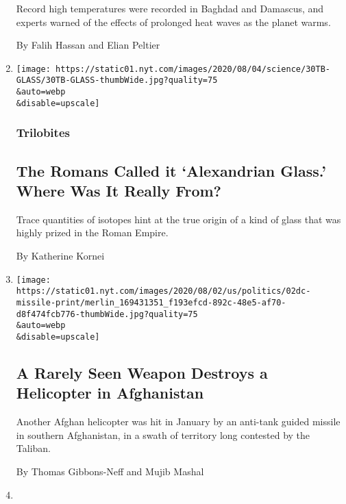 \begin{enumerate}
  Record high temperatures were recorded in Baghdad and Damascus, and
  experts warned of the effects of prolonged heat waves as the planet
  warms.

  By Falih Hassan and Elian Peltier
\item
  \href{/2020/07/31/science/alexandrian-glass-rome.html}{}

  \texttt{[image: https://static01.nyt.com/images/2020/08/04/science/30TB-GLASS/30TB-GLASS-thumbWide.jpg?quality=75\\\&auto=webp\\\&disable=upscale]}

  \hypertarget{trilobites}{%
  \subsubsection{Trilobites}\label{trilobites}}

  \hypertarget{the-romans-called-it-alexandrian-glass-where-was-it-really-from}{%
  \subsection{The Romans Called it `Alexandrian Glass.' Where Was It
  Really
  From?}\label{the-romans-called-it-alexandrian-glass-where-was-it-really-from}}

  Trace quantities of isotopes hint at the true origin of a kind of
  glass that was highly prized in the Roman Empire.

  By Katherine Kornei
\item
  \href{/2020/07/30/world/asia/afghanistan-taliban-helicopter-missile.html}{}

  \texttt{[image: https://static01.nyt.com/images/2020/08/02/us/politics/02dc-missile-print/merlin\_169431351\_f193efcd-892c-48e5-af70-d8f474fcb776-thumbWide.jpg?quality=75\\\&auto=webp\\\&disable=upscale]}

  \hypertarget{a-rarely-seen-weapon-destroys-a-helicopter-in-afghanistan}{%
  \subsection{A Rarely Seen Weapon Destroys a Helicopter in
  Afghanistan}\label{a-rarely-seen-weapon-destroys-a-helicopter-in-afghanistan}}

  Another Afghan helicopter was hit in January by an anti-tank guided
  missile in southern Afghanistan, in a swath of territory long
  contested by the Taliban.

  By Thomas Gibbons-Neff and Mujib Mashal
\item
  \href{/2020/07/30/sports/soccer/saudi-arabia-newcastle-united.html}{}


\end{enumerate}
